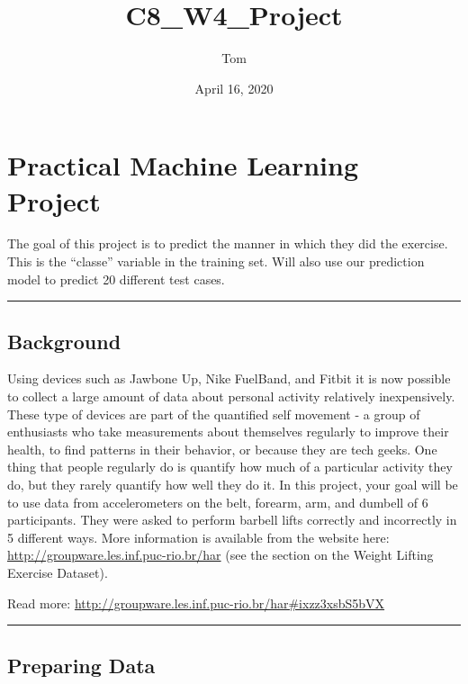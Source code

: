 \documentclass[]{article}
\title{C8\_W4\_Project}
\author{Tom}
\date{April 16, 2020}
\begin{document}
\maketitle

\section{Practical Machine Learning
Project}\label{practical-machine-learning-project}

The goal of this project is to predict the manner in which they did the
exercise. This is the ``classe'' variable in the training set. Will also
use our prediction model to predict 20 different test cases.

\begin{center}\rule{0.5\linewidth}{\linethickness}\end{center}

\subsection{Background}\label{background}

Using devices such as Jawbone Up, Nike FuelBand, and Fitbit it is now
possible to collect a large amount of data about personal activity
relatively inexpensively. These type of devices are part of the
quantified self movement - a group of enthusiasts who take measurements
about themselves regularly to improve their health, to find patterns in
their behavior, or because they are tech geeks. One thing that people
regularly do is quantify how much of a particular activity they do, but
they rarely quantify how well they do it. In this project, your goal
will be to use data from accelerometers on the belt, forearm, arm, and
dumbell of 6 participants. They were asked to perform barbell lifts
correctly and incorrectly in 5 different ways. More information is
available from the website here:
\url{http://groupware.les.inf.puc-rio.br/har} (see the section on the
Weight Lifting Exercise Dataset).

Read more: \url{http://groupware.les.inf.puc-rio.br/har\#ixzz3xsbS5bVX}

\begin{center}\rule{0.5\linewidth}{\linethickness}\end{center}

\subsection{Preparing Data}\label{preparing-data}
\end{document}
